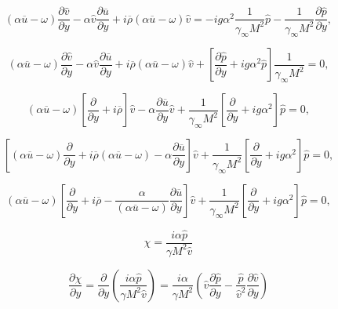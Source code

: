\begin{equation*} 
(\alpha\overline{u}-\omega)
\frac{\partial \hat{v}}{\partial y}
-
\alpha
\hat{v}
\frac{\partial\overline{u}}{\partial y}
+
i
\overline{\rho}
(\alpha \overline{u}-\omega) 
\hat{v}
=
-
i
g\alpha^2
\frac{1}{\gamma_{\infty} M^{2}}
\hat{p}
-
\frac{1}{\gamma_{\infty} M^{2}}
\frac{\partial \hat{p}}{\partial y}
,
\end{equation*} 

\begin{equation*} 
(\alpha \overline{u}-\omega) 
\frac{\partial \hat{v}}{\partial y}
-
\alpha
\hat{v}
\frac{\partial\overline{u}}{\partial y}
+
i
\overline{\rho}
(\alpha \overline{u}-\omega) 
\hat{v}
+
\left[
\frac{\partial \hat{p}}{\partial y}
+
ig\alpha^2
\hat{p}
\right]
\frac{1}{\gamma_{\infty} M^{2}}
=
0
,
\end{equation*} 

\begin{equation*} 
(\alpha \overline{u}-\omega) 
\left[
\frac{\partial }{\partial y}
+
i
\overline{\rho}
\right]
\hat{v}
-
\alpha
\frac{\partial\overline{u}}{\partial y}
\hat{v}
+
\frac{1}{\gamma_{\infty} M^{2}}
\left[
\frac{\partial}{\partial y}
+
ig\alpha^2
\right]
\hat{p}
=
0
,
\end{equation*} 


\begin{equation*} 
\left[
    (\alpha \overline{u}-\omega) 
    \frac{\partial }{\partial y}
    +
    i
    \overline{\rho}
    (\alpha \overline{u}-\omega) 
    -
    \alpha
    \frac{\partial\overline{u}}{\partial y}
\right]
\hat{v}
+
\frac{1}{\gamma_{\infty} M^{2}}
\left[
\frac{\partial}{\partial y}
+
ig\alpha^2
\right]
\hat{p}
=
0
,
\end{equation*} 

\begin{equation*} 
(\alpha \overline{u}-\omega) 
\left[
    \frac{\partial }{\partial y}
    +
    i
    \overline{\rho}
    -
    \frac{\alpha}{(\alpha \overline{u}-\omega)}
    \frac{\partial\overline{u}}{\partial y}
\right]
\hat{v}
+
\frac{1}{\gamma_{\infty} M^{2}}
\left[
\frac{\partial}{\partial y}
+
ig\alpha^2
\right]
\hat{p}
=
0
,
\end{equation*} 

\begin{equation} 
    \chi
    =
    \frac{i\alpha \hat{p}}{\gamma M^2 \hat{v}}
\end{equation} 

\begin{equation*} 
    \frac{\partial \chi}{\partial y}
    =
    \frac{\partial }{\partial y}
    \left(
        \frac{i\alpha \hat{p}}{\gamma M^2 \hat{v}}
    \right)
    =
    \frac{i\alpha }{\gamma M^2 }
    \left(
        \hat{v}
        \frac{\partial \hat{p}}{\partial y}
        -
        \frac{\hat{p}}{\hat{v}^2}
        \frac{\partial \hat{v}}{\partial y}
    \right)
\end{equation*} 


